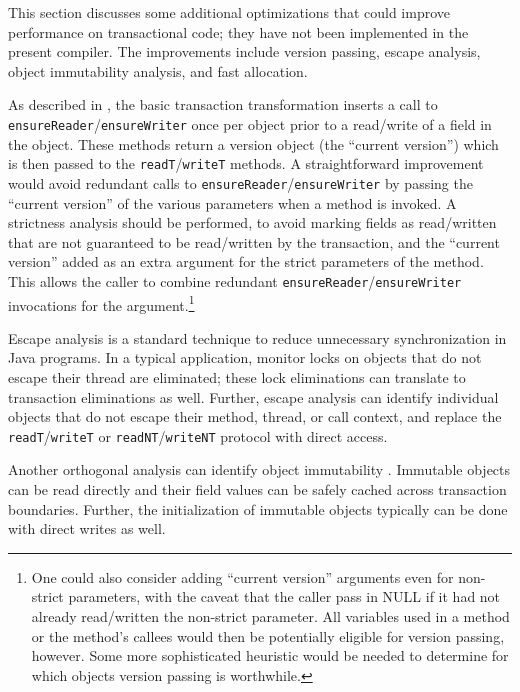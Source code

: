 This section discusses some additional optimizations
that could improve performance on transactional code; they have
not been implemented in the present compiler.  The improvements
include version passing, escape analysis, object immutability
analysis, and fast allocation.

As described in , the basic transaction
transformation inserts a call to
\texttt{ensureReader}/\texttt{ensureWriter} once per object prior to a
read/write of a field in the object.  These methods return a version
object (the ``current version'') which is then passed to the
\texttt{readT}/\texttt{writeT} methods.  A straightforward improvement
would avoid redundant calls to
\texttt{ensureReader}/\texttt{ensureWriter} by passing the ``current
version'' of the various parameters when a method is invoked.  A
strictness analysis should be performed, to avoid marking fields as
read/written that are not guaranteed to be read/written by the
transaction, and the ``current version'' added as an extra argument
for the strict parameters of the method.  This allows the caller to
combine redundant \texttt{ensureReader}/\texttt{ensureWriter}
invocations for the argument.\footnote{One could also consider adding
``current version'' arguments even for non-strict parameters, with the
  caveat that the caller pass in NULL if it had not already
  read/written the non-strict parameter.
  All variables used in a method or the method's callees would then be
  potentially eligible for version passing, however.  Some more sophisticated
  heuristic would be needed to determine for which objects
  version passing is worthwhile.}

Escape analysis \cite{WhaleyRi99} is a standard technique to reduce
unnecessary synchronization in Java programs.  In a typical
application, monitor locks on objects that do not escape their thread
are eliminated; these lock eliminations can translate to transaction
eliminations as well.  Further, escape analysis can identify
individual objects that do not escape their method, thread,
or call context, and replace the \texttt{readT}/\texttt{writeT} or
\texttt{readNT}/\texttt{writeNT} protocol with direct access.

Another orthogonal analysis can identify object immutability
\cite{ZibinPoArKiEr07}.  Immutable objects can be read directly and
their field values can be safely cached across transaction boundaries.
Further, the initialization of immutable objects typically can be done
with direct writes as well.

